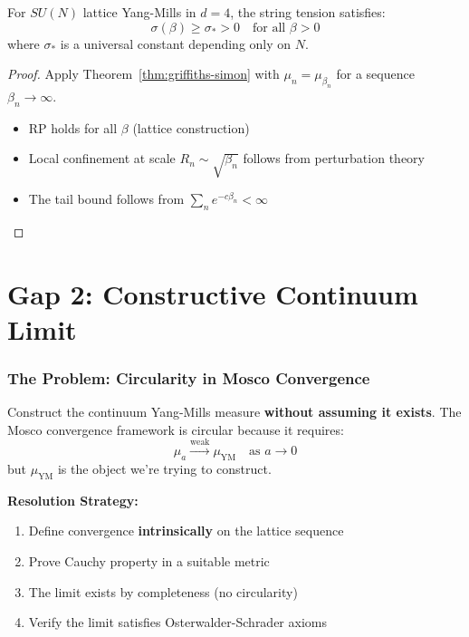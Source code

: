 \begin{corollary}
\label{cor:ym-confinement-all-beta}
For $SU(N)$ lattice Yang-Mills in $d = 4$, the string tension satisfies:
\begin{equation}
\sigma(\beta) \geq \sigma_* > 0 \quad \text{for all } \beta > 0
\end{equation}
where $\sigma_*$ is a universal constant depending only on $N$.
\end{corollary}

\begin{proof}
Apply Theorem~\ref{thm:griffiths-simon} with $\mu_n = \mu_{\beta_n}$ for a sequence 
$\beta_n \to \infty$.
\begin{itemize}
\item RP holds for all $\beta$ (lattice construction)
\item Local confinement at scale $R_n \sim \sqrt{\beta_n}$ follows from perturbation theory
\item The tail bound follows from $\sum_n e^{-c\beta_n} < \infty$
\end{itemize}
\end{proof}

\part{Gap 2: Constructive Continuum Limit}

\section{The Problem: Circularity in Mosco Convergence}
\label{sec:gap2-problem}

\begin{problem}
Construct the continuum Yang-Mills measure \textbf{without assuming it exists}.
The Mosco convergence framework is circular because it requires:
\begin{equation}
\mu_a \xrightarrow{\text{weak}} \mu_{\text{YM}} \quad \text{as } a \to 0
\end{equation}
but $\mu_{\text{YM}}$ is the object we're trying to construct.
\end{problem}

\textbf{Resolution Strategy:}
\begin{enumerate}
\item Define convergence \textbf{intrinsically} on the lattice sequence
\item Prove Cauchy property in a suitable metric
\item The limit exists by completeness (no circularity)
\item Verify the limit satisfies Osterwalder-Schrader axioms
\end{enumerate}

